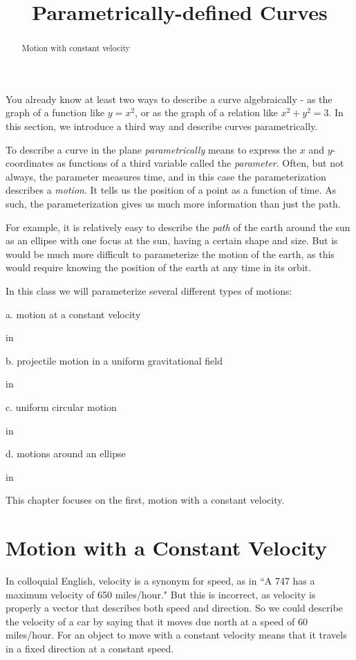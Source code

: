 \documentclass{ximera}
\title{Parametrically-defined Curves}
\newcommand{\pskip}{\vskip 0.1 in}
\begin{document}
\begin{abstract}
Motion with constant velocity
\end{abstract}
\maketitle

You already know at least two ways to describe a curve algebraically - as  the graph of a function like $y=x^2$, or as the graph of a relation like $x^2 + y^2 = 3$. In this section, we introduce a third way and describe curves parametrically. 

To describe a curve in the plane \emph{parametrically} means to express the $x$ and $y$-coordinates as functions of a third variable called the \emph{parameter}. Often, but not always, the parameter measures time, and in this case the parameterization describes a \emph{motion}. It tells us the position of a point as a function of time. As such, the parameterization gives us much more information than just the path.%

For example, it is relatively easy to describe the \emph{path} of the earth around the sun as an ellipse with one focus at the sun, having a certain shape and size. But is would be much more difficult to parameterize the motion of the earth, as this would require knowing the position of the earth at any time in its orbit.

In this class we will parameterize several different types of motions:

a. motion at a constant velocity

\pskip

b. projectile motion in a uniform gravitational field

\pskip

c. uniform circular motion

\pskip

d. motions around an ellipse

\pskip

This chapter focuses on the first, motion with a constant velocity.

\section{Motion with a Constant Velocity}

In colloquial English, velocity is a synonym for speed, as in ``A 747 has a maximum velocity of 650 miles/hour." But this is incorrect, as velocity is properly a vector that describes both speed and direction. So we could describe the velocity of a car by saying that it moves due north at a speed of 60 miles/hour. For an object to move with a constant velocity means that it travels in a fixed direction at a constant speed.
\end{document}
